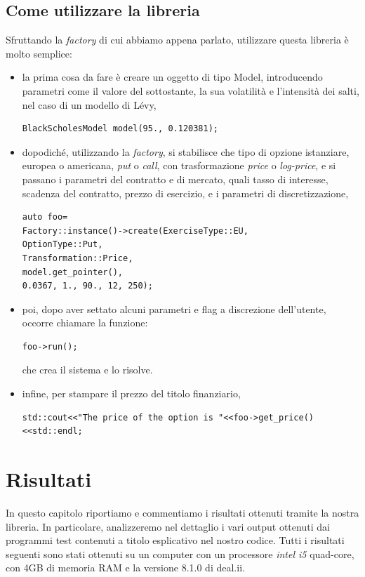 \documentclass[a4paper,10pt]{report}
\theoremstyle{plain}
\theoremstyle{definition}
\theoremstyle{remark}
\begin{document}
\section{Come utilizzare la libreria}
Sfruttando la \emph{factory} di cui abbiamo appena parlato, utilizzare questa libreria \`e molto semplice:
\begin{itemize}
\item la prima cosa da fare \`e creare un oggetto di tipo \textsf{Model}, introducendo parametri come il valore del sottostante, la sua volatilit\`a e l'intensit\`a dei salti, nel caso di un modello di L\'evy,
\begin{lstlisting}
BlackScholesModel model(95., 0.120381);
\end{lstlisting}
\item dopodich\'e, utilizzando la \emph{factory}, si stabilisce che tipo di opzione istanziare, europea o americana, \emph{put} o \emph{call}, con trasformazione \emph{price} o \emph{log-price}, e si passano i parametri del contratto e di mercato, quali tasso di interesse, scadenza del contratto, prezzo di esercizio, e i parametri di discretizzazione,
\begin{lstlisting}
auto foo=
Factory::instance()->create(ExerciseType::EU,
OptionType::Put,
Transformation::Price,
model.get_pointer(),
0.0367, 1., 90., 12, 250);
\end{lstlisting}
\item poi, dopo aver settato alcuni parametri e flag a discrezione dell'utente, occorre chiamare la funzione:
\begin{lstlisting}
foo->run();
\end{lstlisting}
che crea il sistema e lo risolve.
\item infine, per stampare il prezzo del titolo finanziario,
\begin{lstlisting}
std::cout<<"The price of the option is "<<foo->get_price()<<std::endl;
\end{lstlisting}
\end{itemize}
\chapter{Risultati}
In questo capitolo riportiamo e commentiamo i risultati ottenuti tramite la nostra libreria. In particolare, analizzeremo nel dettaglio i vari output ottenuti dai programmi \textsf{test} contenuti a titolo esplicativo nel nostro codice. Tutti i risultati seguenti sono stati ottenuti su un computer con un processore \emph{intel i5} quad-core, con 4GB di memoria RAM e la versione 8.1.0 di \textsf{deal.ii}.
\end{document}
